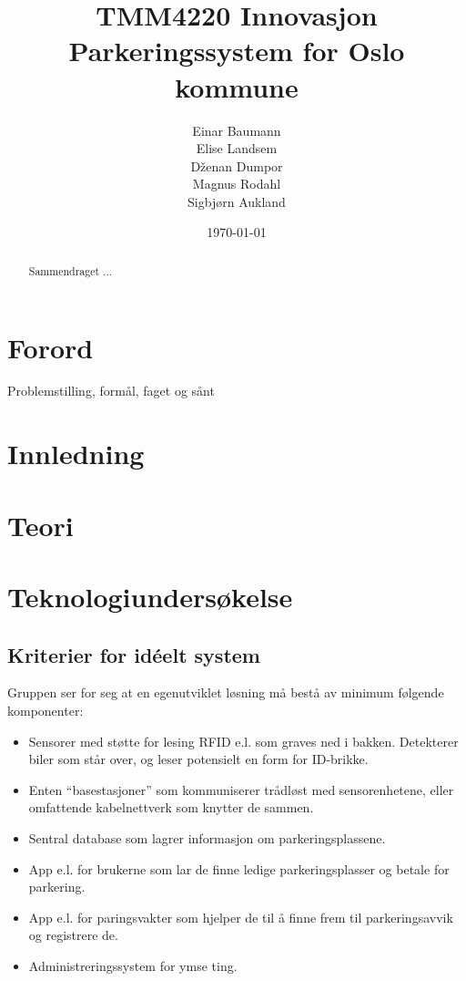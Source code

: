 \documentclass[a4paper, norsk, 12pt]{article}
\title{TMM4220 Innovasjon \\ 
\vspace{6pt}\large Parkeringssystem for Oslo kommune \\ \vspace{50pt} 
 }
\author{Einar Baumann \\Elise Landsem\\D\v{z}enan Dumpor\\Magnus Rodahl\\Sigbjørn Aukland}
\date{\today}
\theoremstyle{remark}
\begin{document}
\maketitle
\thispagestyle{empty}
\vspace{50pt}
\begin{abstract}
Sammendraget ...
\end{abstract}
\pagebreak

\tableofcontents
\pagebreak

\section*{Forord}
Problemstilling, formål, faget og sånt
\pagebreak



\section{Innledning}
\label{sec:innledning}
\cite{vekstbedriften}




\section{Teori}
\label{sec:teori}






\section{Teknologiundersøkelse}
\label{sec:teknologi}

\subsection{Kriterier for idéelt system}
\label{sub:ideelt_system}
Gruppen ser for seg at en egenutviklet løsning må bestå av minimum følgende komponenter:

\begin{itemize}
	\item Sensorer med støtte for lesing RFID e.l. som graves ned i bakken. Detekterer biler som står over, og leser potensielt en form for ID-brikke.
	\item Enten “basestasjoner” som kommuniserer trådløst med sensorenhetene, eller omfattende kabelnettverk som knytter de sammen.
	\item Sentral database som lagrer informasjon om parkeringsplassene.
 	\item App e.l. for brukerne som lar de finne ledige parkeringsplasser og betale for parkering.
	\item App e.l. for paringsvakter som hjelper de til å finne frem til parkeringsavvik og registrere de.
	\item Administreringssystem for ymse ting.
\end{itemize}
\end{document}
